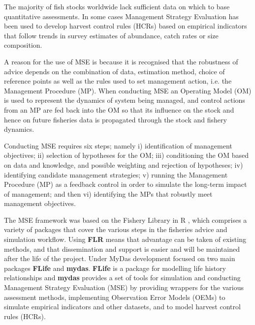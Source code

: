 The majority of fish stocks worldwide lack sufficient data on which to base quantitative assessments. In some cases Management Strategy Evaluation \citep[MSE][]{10.1093/icesjms/fst232} has been used to develop harvest control rules (HCRs) based on empirical indicators that follow trends in survey estimates of abundance, catch rates or size composition. %

A reason for the use of MSE is because it is recognised that the robustness of advice depends on the combination of data, estimation method, choice of reference points as well as the rules used to set management action, i.e. the Management Procedure (MP). When conducting MSE an Operating Model (OM) is used to represent the dynamics of system being managed, and control actions from an MP are fed back into the OM so that its influence on the stock and hence on future fisheries data is propagated through the stock and fishery dynamics. 

Conducting MSE requires six steps; namely i) identification of management objectives; ii) selection of hypotheses for the OM; iii) conditioning the OM based on data and knowledge, and possible weighting and rejection of hypotheses; iv) identifying candidate management strategies; v) running the Management Procedure (MP) as a feedback control in order to simulate the long-term impact of management; and then vi) identifying the MPs that robustly meet management objectives. 

The MSE framework was based on the Fishery Library in R \citep[\href{http://www.flr-project.org/}{FLR}][]{kell2007flr}, which comprises a variety of packages that cover the various steps in the fisheries advice and simulation workflow. Using \textbf{FLR} means that advantage can be taken of existing methods, and that dissemination and support is easier and will be maintained after the life of the project. Under MyDas development focused on two main packages \textbf{FLife} and \textbf{mydas}. \textbf{FLife} is a package for modelling life history relationships and \textbf{mydas} provides a set of tools for simulation and conducting Management Strategy Evaluation (MSE) by providing wrappers for the various assessment methods, implementing Observation Error Models (OEMs) to simulate empirical indicators and other datasets, and to model harvest control rules (HCRs).

